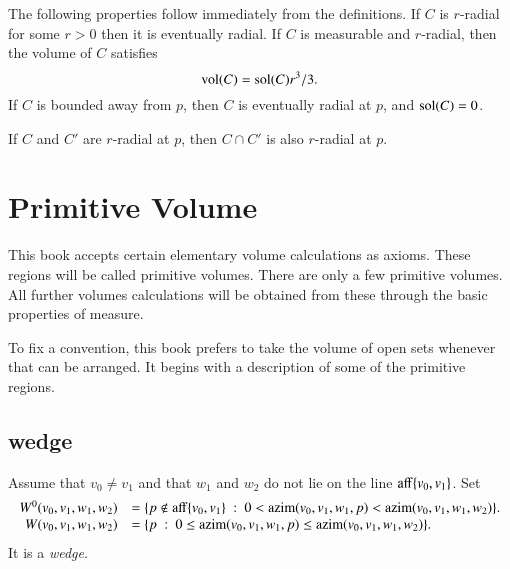 The following properties follow immediately from the definitions.
If $C$ is $r$-radial for some $r>0$ then it is eventually radial.
If $C$ is measurable and $r$-radial, then the volume of $C$
satisfies
    $$
    {\operatorname{vol}}(C) = {\operatorname{sol}}(C) r^3/3.
    $$
If $C$ is bounded away from $p$, then $C$ is eventually radial at
$p$, and ${\operatorname{sol}}(C) = 0$.
%

\begin{lemma}  If $C$ and $C'$ are  $r$-radial
at $p$, then $C\cap C'$ is also $r$-radial at
$p$.
\end{lemma}






\section{Primitive Volume}
%

This book accepts
certain elementary volume calculations as axioms.  
These regions will be called primitive volumes.  There are only
a few primitive volumes.
All further
volumes calculations will be obtained from these through the basic
properties of measure.   

To fix a convention, this book prefers to take the volume of open sets whenever that can be arranged.  It begins with a description of some of the primitive regions.

\subsection{wedge}
%


\begin{definition}[wedge]
Assume that $v_0\ne v_1$ and that
$w_1$ and $w_2$ do not lie on
the line ${\operatorname{aff}}\{v_0,v_1\}$.  Set
$$
\begin{array}{rll}
W^0(v_0,v_1,w_1,w_2) &= 
  \{p\not\in{\operatorname{aff}}\{v_0,v_1\} \ :\  
  0< {\operatorname{azim}}(v_0,v_1,w_1,p) < {\operatorname{azim}}(v_0,v_1,w_1,w_2)\}.\\
W(v_0,v_1,w_1,w_2) &= 
  \{p \ :\  
  0\le {\operatorname{azim}}(v_0,v_1,w_1,p) \le {\operatorname{azim}}(v_0,v_1,w_1,w_2)\}.\\
\end{array}
$$
It is a {\it wedge}.
\end{definition}

